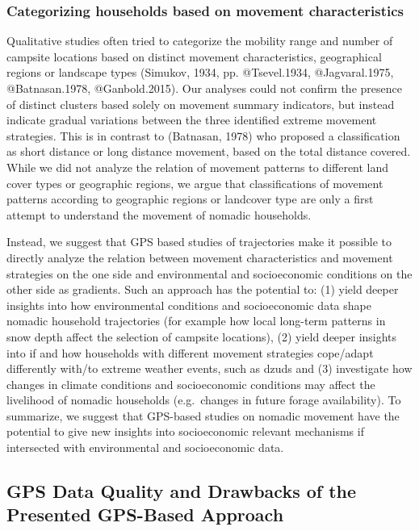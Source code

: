 \documentclass[]{elsarticle} %
\begin{document}
\hypertarget{categorizing-households-based-on-movement-characteristics}{%
\subsubsection{Categorizing households based on movement
characteristics}\label{categorizing-households-based-on-movement-characteristics}}

Qualitative studies often tried to categorize the mobility range and
number of campsite locations based on distinct movement characteristics,
geographical regions or landscape types (Simukov, 1934, pp.
@Tsevel.1934, @Jagvaral.1975, @Batnasan.1978, @Ganbold.2015). Our
analyses could not confirm the presence of distinct clusters based
solely on movement summary indicators, but instead indicate gradual
variations between the three identified extreme movement strategies.
This is in contrast to (Batnasan, 1978) who proposed a classification as
short distance or long distance movement, based on the total distance
covered. While we did not analyze the relation of movement patterns to
different land cover types or geographic regions, we argue that
classifications of movement patterns according to geographic regions or
landcover type are only a first attempt to understand the movement of
nomadic households.

Instead, we suggest that GPS based studies of trajectories make it
possible to directly analyze the relation between movement
characteristics and movement strategies on the one side and
environmental and socioeconomic conditions on the other side as
gradients. Such an approach has the potential to: (1) yield deeper
insights into how environmental conditions and socioeconomic data shape
nomadic household trajectories (for example how local long-term patterns
in snow depth affect the selection of campsite locations), (2) yield
deeper insights into if and how households with different movement
strategies cope/adapt differently with/to extreme weather events, such
as dzuds and (3) investigate how changes in climate conditions and
socioeconomic conditions may affect the livelihood of nomadic households
(e.g.~changes in future forage availability). To summarize, we suggest
that GPS-based studies on nomadic movement have the potential to give
new insights into socioeconomic relevant mechanisms if intersected with
environmental and socioeconomic data.

\hypertarget{gps-data-quality-and-drawbacks-of-the-presented-gps-based-approach}{%
\subsection{GPS Data Quality and Drawbacks of the Presented GPS-Based
Approach}\label{gps-data-quality-and-drawbacks-of-the-presented-gps-based-approach}}
\end{document}
